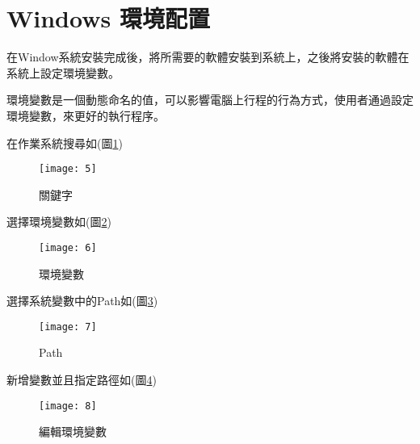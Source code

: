 \section{Windows 環境配置}
\par
\renewcommand{\baselinestretch}{1} %
\twelve \qquad 在Window系統安裝完成後，將所需要的軟體安裝到系統上，之後將安裝的軟體在系統上設定環境變數。
\\
\par
\renewcommand{\baselinestretch}{1} %
\twelve \hspace{0.5em} 環境變數是一個動態命名的值，可以影響電腦上行程的行為方式，使用者通過設定環境變數，來更好的執行程序。
\\
\par
\renewcommand{\baselinestretch}{1} %
\twelve \hspace{0.5em} 在作業系統搜尋如(圖\ref{fig.關鍵字})
\\
\par
\renewcommand{\baselinestretch}{1.7} %
\begin{figure}[hbt!]
\begin{center}
\texttt{[image: 5]}
\caption{\large 關鍵字}\label{fig.關鍵字}
\end{center}
\end{figure}
\par
\renewcommand{\baselinestretch}{1} %
\twelve \hspace{0.5em} 選擇環境變數如(圖\ref{fig.環境變數})
\\
\par
\renewcommand{\baselinestretch}{1.7} %
\begin{figure}[hbt!]
\begin{center}
\texttt{[image: 6]}
\caption{\large 環境變數}\label{fig.環境變數}
\end{center}
\end{figure}
\par
\renewcommand{\baselinestretch}{1} %
\twelve \hspace{0.5em} 選擇系統變數中的Path如(圖\ref{fig.Path})
\\
\par
\renewcommand{\baselinestretch}{1.7} %
\begin{figure}[hbt!]
\begin{center}
\texttt{[image: 7]}
\caption{\large Path}\label{fig.Path}
\end{center}
\end{figure}
\par
\renewcommand{\baselinestretch}{1} %
\twelve \hspace{0.5em} 新增變數並且指定路徑如(圖\ref{fig.編輯環境變數})
\\
\par
\renewcommand{\baselinestretch}{1.7} %
\begin{figure}[hbt!]
\begin{center}
\texttt{[image: 8]}
\caption{\large 編輯環境變數}\label{fig.編輯環境變數}
\end{center}
\end{figure}
\par

